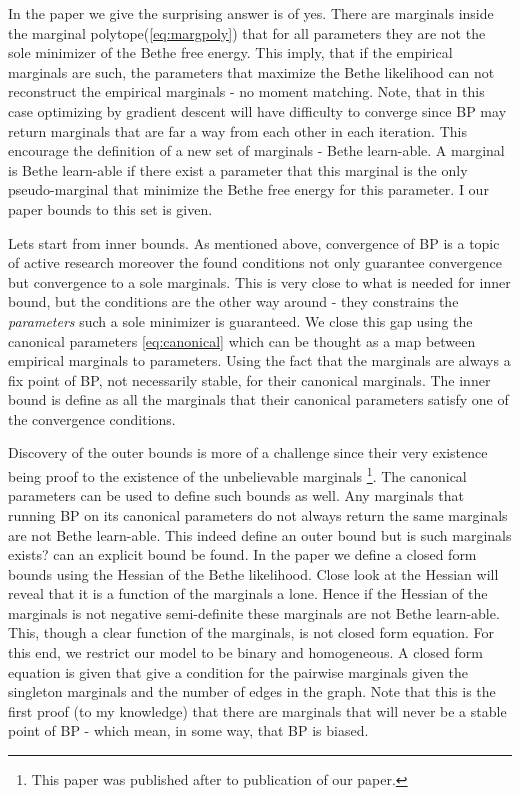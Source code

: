 {In the paper \cite{heinemann2012cannot} we give the surprising answer is of yes.
There are marginals inside the marginal polytope(\eqref{eq:margpoly}) that for all parameters they are not the sole minimizer of the Bethe free energy.
This imply, that if the empirical marginals are such, the parameters that maximize the Bethe likelihood can not reconstruct the empirical marginals - no moment matching.
Note, that in this case optimizing by gradient descent will have difficulty to converge since BP may return marginals that are far a way from each other in each iteration.
This encourage the definition of a new set of marginals - Bethe learn-able.
A marginal is Bethe learn-able if there exist a parameter that this marginal is the only pseudo-marginal that minimize the Bethe free energy for this parameter.
I our paper bounds to this set is given.

Lets start from inner bounds.
As mentioned above, convergence of BP is a topic of active research moreover the found conditions not only guarantee convergence but convergence to a sole marginals.
This is very close to what is needed for inner bound, but the conditions are the other way around - they constrains the \textit{parameters} such a sole minimizer is guaranteed.
We close this gap using the canonical parameters \eqref{eq:canonical} which can be thought as a map between empirical marginals to parameters.
Using the fact that the marginals are always a fix point of BP, not necessarily stable, for their canonical marginals.
The inner bound is define as all the marginals that their canonical parameters satisfy one of the convergence conditions.

Discovery of the outer bounds is more of a challenge since their very existence being proof to the existence of the unbelievable marginals \cite{pitkow2011learning}\footnote{This paper was published after to publication of our paper.}.
The canonical parameters can be used to define such bounds as well.
Any marginals that running BP on its canonical parameters do not always return the same marginals are not Bethe learn-able.
This indeed define an outer bound but is such marginals exists? can an explicit bound be found.
In the paper we define a closed form bounds using the Hessian of the Bethe likelihood.
Close look at the Hessian will reveal that it is a function of the marginals a lone.
Hence if the Hessian of the marginals is not negative semi-definite these marginals are not Bethe learn-able.
This, though a clear function of the marginals, is not closed form equation.
For this end, we restrict our model to be binary and homogeneous. 
A closed form equation is given that give a condition for the pairwise marginals given the singleton marginals and the number of edges in the graph.
Note that this is the first proof (to my knowledge) that there are marginals that will never be a stable point of BP - which mean, in some way, that BP is biased.

}

